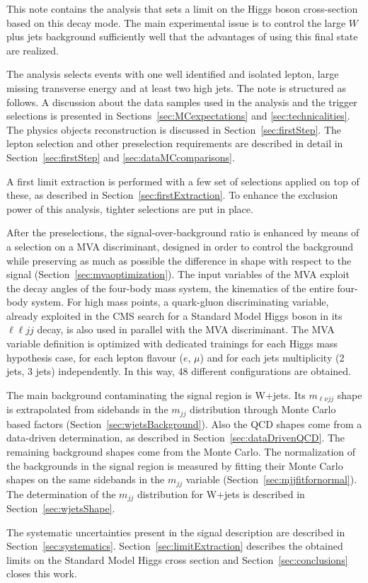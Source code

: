 This note contains the analysis that sets a limit on the Higgs boson cross-section
based on this decay mode. 
The main experimental issue is to control the large $W$ plus jets 
background sufficiently well that the advantages of using this 
final state are realized.

The analysis selects events with one well identified and isolated lepton, 
large missing transverse energy and at least two high \pt jets.
The note is structured as follows. 
A discussion about the data samples used in the analysis and the trigger selections
is presented in Sections~\ref{sec:MCexpectations} and \ref{sec:technicalities}.  
The physics objects reconstruction is discussed in Section~\ref{sec:firstStep}.
The lepton selection and other preselection requirements are described in detail 
in Section~\ref{sec:firstStep} and \ref{sec:dataMCcomparisons}.

A first limit extraction is performed with a few set of selections applied on top of these,
as described in Section~\ref{sec:firstExtraction}.
To enhance the exclusion power of this analysis, 
tighter selections are put in place.

After the preselections,
the signal-over-background ratio is enhanced by means of a selection on a MVA discriminant, 
designed in order to control the background while preserving as much as possible the difference in shape
with respect to the signal (Section~\ref{sec:mvaoptimization}).
The input variables of the MVA exploit the decay angles of the four-body mass system, 
the kinematics of the entire four-body system. For high mass points, a quark-gluon discriminating
variable, already exploited in the CMS search for a Standard Model Higgs boson in its $\ell{}\ell{}jj$ decay,
is also used in parallel with the MVA discriminant.
The MVA variable definition is optimized with dedicated trainings for each Higgs mass hypothesis case, 
for each lepton flavour ($e$, $\mu$) and for each jets multiplicity (2 jets, 3 jets) independently.
In this way, 48 different configurations are obtained.

The main background contaminating the signal region is W+jets.
Its $m_{\ell{}\nu{}jj}$ shape is extrapolated from sidebands in the $m_{jj}$ distribution 
through Monte Carlo based factors (Section~\ref{sec:wjetsBackground}).
Also the QCD shapes come from a data-driven determination, as described in Section~\ref{sec:dataDrivenQCD}.
The remaining background shapes come from the Monte Carlo.
The normalization of the backgrounds in the signal region 
is measured by fitting their Monte Carlo shapes on the same sidebands in the $m_{jj}$ variable 
(Section~\ref{sec:mjjfitfornormal}).
The determination of the $m_{jj}$ distribution for W+jets is described in Section~\ref{sec:wjetsShape}.

The systematic uncertainties present in the signal description are described in Section~\ref{sec:systematics}.
Section~\ref{sec:limitExtraction} describes the obtained limits on the Standard Model Higgs cross section
and Section~\ref{sec:conclusions} closes this work.

